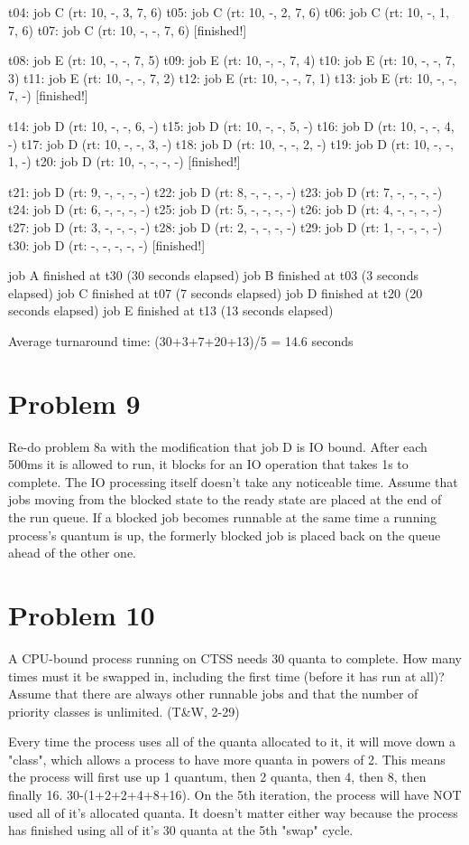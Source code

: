 \documentclass[11pt]{article}
\begin{document}
t04: job C (rt: 10, -, 3, 7, 6)
t05: job C (rt: 10, -, 2, 7, 6)
t06: job C (rt: 10, -, 1, 7, 6)
t07: job C (rt: 10, -, -, 7, 6) [finished!]

t08: job E (rt: 10, -, -, 7, 5)
t09: job E (rt: 10, -, -, 7, 4)
t10: job E (rt: 10, -, -, 7, 3)
t11: job E (rt: 10, -, -, 7, 2)
t12: job E (rt: 10, -, -, 7, 1)
t13: job E (rt: 10, -, -, 7, -) [finished!]

t14: job D (rt: 10, -, -, 6, -)
t15: job D (rt: 10, -, -, 5, -)
t16: job D (rt: 10, -, -, 4, -)
t17: job D (rt: 10, -, -, 3, -)
t18: job D (rt: 10, -, -, 2, -)
t19: job D (rt: 10, -, -, 1, -)
t20: job D (rt: 10, -, -, -, -) [finished!]

t21: job D (rt: 9, -, -, -, -)
t22: job D (rt: 8, -, -, -, -)
t23: job D (rt: 7, -, -, -, -)
t24: job D (rt: 6, -, -, -, -)
t25: job D (rt: 5, -, -, -, -)
t26: job D (rt: 4, -, -, -, -)
t27: job D (rt: 3, -, -, -, -)
t28: job D (rt: 2, -, -, -, -)
t29: job D (rt: 1, -, -, -, -)
t30: job D (rt: -, -, -, -, -) [finished!]

job A finished at t30 (30 seconds elapsed)
job B finished at t03 (3 seconds elapsed)
job C finished at t07 (7 seconds elapsed)
job D finished at t20 (20 seconds elapsed)
job E finished at t13 (13 seconds elapsed)

Average turnaround time: (30+3+7+20+13)/5 = 14.6 seconds


\section*{Problem 9}
Re-do problem 8a with the modification that job D is IO bound. After each 500ms it is allowed to run, it blocks for an IO operation that takes 1s to complete. The IO processing itself doesn’t take any noticeable time. Assume that jobs moving from the blocked state to the ready state are placed at the end of the run queue. If a blocked job becomes runnable at the same time a running process’s quantum is up, the formerly blocked job is placed back on the queue ahead of the other one.



\section*{Problem 10}
A CPU-bound process running on CTSS needs 30 quanta to complete. How many times must it be swapped in, including the first time (before it has run at all)? Assume that there are always other runnable jobs and that the number of priority classes is unlimited. (T\&W, 2-29)

Every time the process uses all of the quanta allocated to it, it will move down a "class", which allows a process to have more quanta in powers of 2. This means the process will first use up 1 quantum, then 2 quanta, then 4, then 8, then finally 16. 30-(1+2+2+4+8+16). On the 5th iteration, the process will have NOT used all of it's allocated quanta. It doesn't matter either way because the process has finished using all of it's 30 quanta at the 5th "swap" cycle. 
\end{document}
